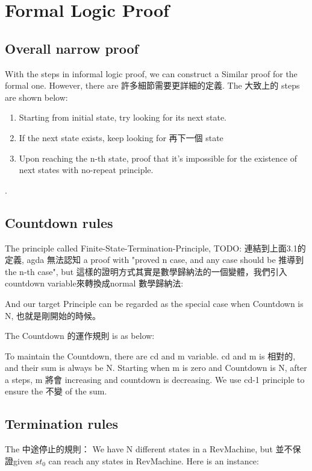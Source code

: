\section{Formal Logic Proof}

\subsection{ Overall narrow proof }

With the steps in informal logic proof, we can construct a Similar proof for the formal one.  However, there are 許多細節需要更詳細的定義.
The 大致上的 steps are shown below:
\begin{enumerate}[1.]
\item Starting from initial state, try looking for its next state. 
\item If the next state exists, keep looking for 再下一個 state
\item Upon reaching the n-th state, proof that it's impossible for the existence of next states with no-repeat principle.
\end{enumerate}.

\subsection{ Countdown rules }
The principle called Finite-State-Termination-Principle, {TODO: 連結到上面3.1的定義}, agda 無法認知 a proof with "proved n case, and any case should be 推導到 the n-th case", but 這樣的證明方式其實是數學歸納法的一個變體，我們引入countdown variable來轉換成normal 數學歸納法:


And our target Principle can be regarded as the special case when Countdown is N, 也就是剛開始的時候。

The Countdown 的運作規則 is as below:


To maintain the Countdown, there are cd and m variable.  cd and m is 相對的, and their sum is always be N.  Starting when m is zero and Countdown is N, after a steps, m 將會 increasing and countdown is decreasing.  We use cd-1 principle to ensure the 不變 of the sum.

\subsection{ Termination rules }
The 中途停止的規則：
We have N different states in a RevMachine, but 並不保證given $st_{0}$ can reach any states in RevMachine.  Here is an instance: 

